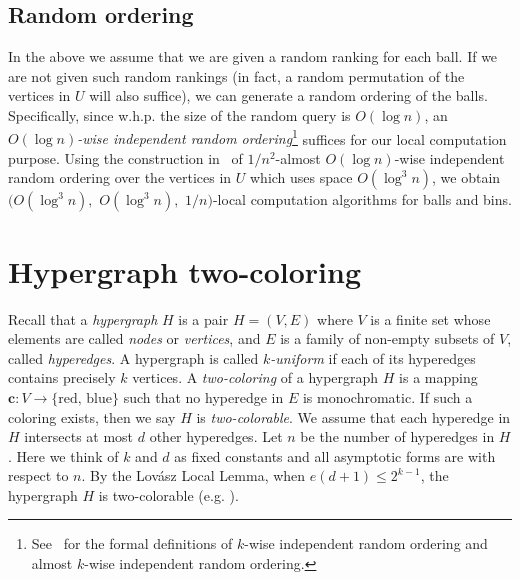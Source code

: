 \documentclass[english, oribibl]{llncs}
\begin{document}
\subsection{Random ordering}
In the above we assume that we are given a random ranking for each ball.
If we are not given such random rankings
(in fact, a random permutation of the vertices in $U$ will also suffice),
we can generate a random ordering of the balls.
Specifically, since w.h.p. the size of the random query is $O(\log n)$,
 an \emph{$O(\log n)$-wise independent random ordering}\footnote{
 See~\cite{ARV+11} for
the formal definitions of $k$-wise independent random ordering and almost $k$-wise independent random ordering.}
suffices for our local computation purpose.
Using the construction in~\cite{ARV+11} of
$1/n^2$-almost $O(\log n)$-wise independent random ordering over the vertices in $U$
which uses space $O(\log^{3}n)$, we obtain
$(O(\log^3 n), $ $O(\log^3 n),$ $ 1/n)$-local
computation algorithms for balls and bins.









\newpage



\newpage

\appendix


\newcommand{\polylog}[1]{\mathrm{polylog}(#1)}
\newcommand{\ttwo}{\log n}

\section{Hypergraph two-coloring}\label{Sec:hypergraph}
\label{app_hypergraph}
Recall that a \emph{hypergraph} $H$ is a pair $H = (V,E)$ where $V$ is a finite set whose elements are
called \emph{nodes} or \emph{vertices}, and $E$ is a family of non-empty subsets of $V$, 
called \emph{hyperedges}. 
A hypergraph is called \emph{$k$-uniform} if each of its
hyperedges contains precisely $k$ vertices.
A \emph{two-coloring} of a hypergraph $H$ is a mapping $\mathbf{c}: V\to \{\text{red, blue}\}$
such that no hyperedge in $E$ is monochromatic.
If such a coloring exists, then we say $H$ is \emph{two-colorable}.
We assume that each
hyperedge in $H$ intersects at most $d$ other hyperedges.
Let $n$ be the number of hyperedges in $H$. Here we think of $k$ and $d$ as fixed constants
and all asymptotic forms are with respect to $n$.
By the Lov{\'{a}}sz Local Lemma,
when $e(d+1) \leq 2^{k-1}$, the hypergraph $H$ is
two-colorable (e.g. \cite{Alo91}).
\end{document}
